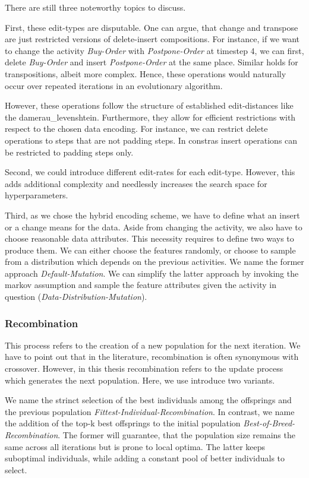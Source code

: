 \documentclass[./../../paper.tex]{subfiles}
\begin{document}
There are still three noteworthy topics to discuss. 

First, these edit-types are disputable. One can argue, that change and transpose are just restricted versions of delete-insert compositions. For instance, if we want to change the activity \emph{Buy-Order} with \emph{Postpone-Order} at timestep 4, we can first, delete \emph{Buy-Order} and insert \emph{Postpone-Order} at the same place. Similar holds for transpositions, albeit more complex. Hence, these operations would naturally occur over repeated iterations in an evolutionary algorithm.

However, these operations follow the structure of established edit-distances like the \gls{damerau_levenshtein}. Furthermore, they allow for efficient restrictions with respect to the chosen data encoding. For instance, we can restrict delete operations to steps that are not padding steps. In constras insert operations can be restricted to padding steps only.

Second, we could introduce different edit-rates for each edit-type. However, this adds additional complexity and needlessly increases the search space for hyperparameters.

Third, as we chose the hybrid encoding scheme, we have to define what an insert or a change means for the data. Aside from changing the activity, we also have to choose reasonable data attributes. This necessity requires to define two ways to produce them. We can either choose the features randomly, or choose to sample from a distribution which depends on the previous activities. We name the former approach \emph{Default-Mutation}. We can simplify the latter approach by invoking the markov assumption and sample the feature attributes given the activity in question (\emph{Data-Distribution-Mutation}). 

\subsubsection{Recombination}
This process refers to the creation of a new population for the next iteration. We have to point out that in the literature, recombination is often synonymous with crossover. However, in this thesis recombination refers to the update process which generates the next population. Here, we use introduce two variants. 

We name the strinct selection of the best individuals among the offsprings and the previous population \emph{Fittest-Individual-Recombination}. In contrast, we name the addition of the top-k best offsprings to the initial population \emph{Best-of-Breed-Recombination}. The former will guarantee, that the population size remains the same across all iterations but is prone to local optima. The latter keeps suboptimal individuals, while adding a constant pool of better individuals to select.
\end{document}
